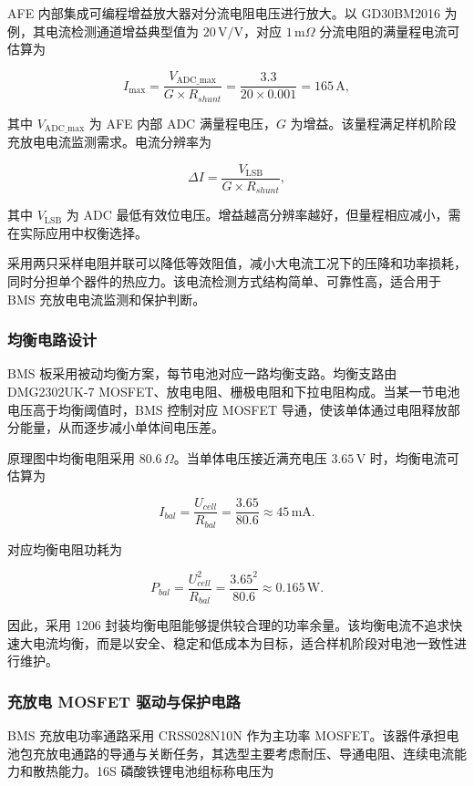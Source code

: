 AFE 内部集成可编程增益放大器对分流电阻电压进行放大。以 GD30BM2016 为例，其电流检测通道增益典型值为 $20\,\mathrm{V/V}$，对应 $1\,\mathrm{m}\Omega$ 分流电阻的满量程电流可估算为

\[
I_{\max}=\frac{V_{\mathrm{ADC\_max}}}{G\times R_{shunt}}
=\frac{3.3}{20\times0.001}
=165\,\mathrm{A},
\]

其中 $V_{\mathrm{ADC\_max}}$ 为 AFE 内部 ADC 满量程电压，$G$ 为增益。该量程满足样机阶段充放电电流监测需求。电流分辨率为

\[
\Delta I=\frac{V_{\mathrm{LSB}}}{G\times R_{shunt}},
\]

其中 $V_{\mathrm{LSB}}$ 为 ADC 最低有效位电压。增益越高分辨率越好，但量程相应减小，需在实际应用中权衡选择。

采用两只采样电阻并联可以降低等效阻值，减小大电流工况下的压降和功率损耗，同时分担单个器件的热应力。该电流检测方式结构简单、可靠性高，适合用于 BMS 充放电电流监测和保护判断。

\subsubsection{均衡电路设计}

BMS 板采用被动均衡方案，每节电池对应一路均衡支路。均衡支路由 DMG2302UK-7 MOSFET、放电电阻、栅极电阻和下拉电阻构成。当某一节电池电压高于均衡阈值时，BMS 控制对应 MOSFET 导通，使该单体通过电阻释放部分能量，从而逐步减小单体间电压差。

原理图中均衡电阻采用 $80.6\,\Omega$。当单体电压接近满充电压 $3.65\,\mathrm{V}$ 时，均衡电流可估算为

\[
I_{bal}=\frac{U_{cell}}{R_{bal}}
=\frac{3.65}{80.6}
\approx45\,\mathrm{mA}.
\]

对应均衡电阻功耗为

\[
P_{bal}=\frac{U_{cell}^2}{R_{bal}}
=\frac{3.65^2}{80.6}
\approx0.165\,\mathrm{W}.
\]

因此，采用 1206 封装均衡电阻能够提供较合理的功率余量。该均衡电流不追求快速大电流均衡，而是以安全、稳定和低成本为目标，适合样机阶段对电池一致性进行维护。

\subsubsection{充放电 MOSFET 驱动与保护电路}

BMS 充放电功率通路采用 CRSS028N10N 作为主功率 MOSFET。该器件承担电池包充放电通路的导通与关断任务，其选型主要考虑耐压、导通电阻、连续电流能力和散热能力。16S 磷酸铁锂电池组标称电压为

